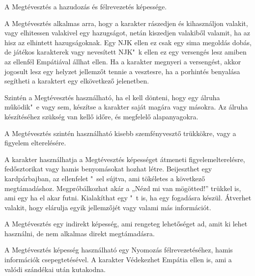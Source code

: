 
A Megtévesztés a hazudozás és félrevezetés képessége.

\overcome A Megtévesztés alkalmas arra, hogy a karakter rászedjen és kihasználjon valakit, vagy elhitessen valakivel egy hazugságot, netán kiszedjen valakiből valamit, ha az hisz az elhintett hazugságoknak. Egy NJK ellen ez csak egy sima megoldás dobás, de játékos karakterek vagy nevesített NJK"~k ellen ez egy versengés lesz amiben az ellenfél Empátiával állhat ellen. Ha a karakter megnyeri a versengést, akkor jogosult lesz egy helyzet jellemzőt tennie a vesztesre, ha a porhintés benyalása segítheti a karaktert egy elkövetkező jelenetben.

Szintén a Megtévesztés használható, ha el kell dönteni, hogy egy álruha működik"~e vagy sem, készítse a karakter saját magára vagy másokra. Az álruha készítéséhez szükség van kellő időre, és megfelelő alapanyagokra.

A Megtévesztés szintén használható kisebb szemfényvesztő trükkökre, vagy a figyelem elterelésére.

\advantage A karakter használhatja a Megtévesztés képességet átmeneti figyelemelterelésre, fedősztorikat vagy hamis benyomásokat hozhat létre. Beijeszthet egy kardpárbajban, az ellenfelet "~sel sújtva, ami tökéletes a következő megtámadáshoz. Megpróbálkozhat akár a „Nézd mi van mögötted!” trükkel is, ami egy  ha el akar futni. Kialakíthat egy "~t is, ha egy fogadásra készül. Átverhet valakit, hogy elárulja egyik jellemzőjét vagy valami más információt.

\attack A Megtévesztés egy indirekt képesség, ami rengeteg lehetőséget ad, amit ki lehet használni, de nem alkalmas direkt megtámadásra.
 
 A Megtévesztés képesség használható egy Nyomozás félrevezetéséhez, hamis információk csepegtetésével. A karakter Védekezhet Empátia ellen is, ami a valódi szándékai után kutakodna.



